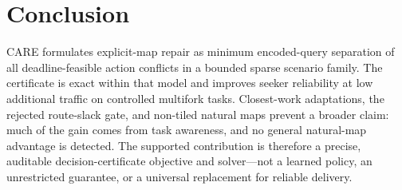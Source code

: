 \documentclass[conference]{IEEEtran}
\begin{document}
\section{Conclusion}
CARE formulates explicit-map repair as minimum encoded-query separation of all
deadline-feasible action conflicts in a bounded sparse scenario family. The
certificate is exact within that model and improves seeker reliability at low
additional traffic on controlled multifork tasks. Closest-work adaptations,
the rejected route-slack gate, and non-tiled natural maps prevent a broader
claim: much of the gain comes from task awareness, and no general natural-map
advantage is detected. The supported contribution is therefore a precise,
auditable decision-certificate objective and solver---not a learned policy,
an unrestricted guarantee, or a universal replacement for reliable delivery.



\end{document}
